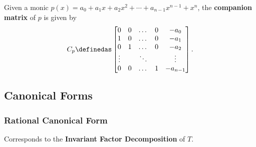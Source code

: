 \begin{description}
\tightlist
\item[Definition (Companion Matrix)]
Given a monic
\(p(x) = a_0 + a_1 x + a_2 x^2 + \cdots + a_{n-1} x^{n-1} + x^n\), the
\textbf{companion matrix} of \(p\) is given by \begin{align*}
C_p \definedas 
\begin{bmatrix}
0 & 0 & \dots & 0 &-a_0 \\ 
1 & 0 & \dots & 0 & -a_1 \\ 
0 & 1 & \dots & 0 & -a_2 \\ 
\vdots & & \ddots & & \vdots \\ 
0 & 0 & \dots & 1 & -a_{n-1} 
\end{bmatrix}
.\end{align*}
\end{description}

\hypertarget{canonical-forms}{%
\subsection{Canonical Forms}\label{canonical-forms}}

\hypertarget{rational-canonical-form}{%
\subsubsection{Rational Canonical Form}\label{rational-canonical-form}}

Corresponds to the \textbf{Invariant Factor Decomposition} of \(T\).

